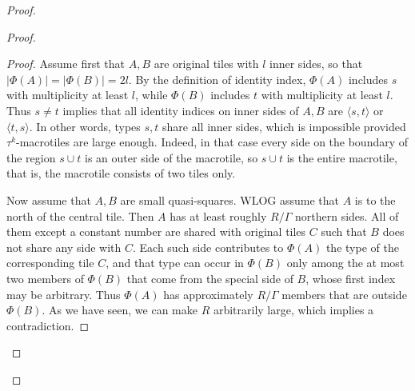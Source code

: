 \documentclass[12pt]{article}
\theoremstyle{remark}
\newcommand{\pair}[1]{\langle #1\rangle}
\begin{document}
\begin{proof}
\begin{proof}
\begin{proof}
Assume first that $A,B$ are original tiles with $l$ inner sides,
so that $|\Phi(A)|=|\Phi(B)|=2l$. By the definition of identity index,
 $\Phi(A)$ includes $s$ with multiplicity at least $l$, while $\Phi(B)$ includes $t$ with multiplicity at least $l$.
Thus $s\ne t$ implies that all identity indices on inner sides of $A,B$ are $\pair{s,t}$ or $\pair{t,s}$.
In other words, types $s,t$ share all inner sides, which is impossible provided $\tau^k$-macrotiles
are large enough. Indeed, in that case every side on the boundary of the region $s\cup t$ is an
outer side of the macrotile, so $s\cup t$ is the entire macrotile, that is, the macrotile consists
of two tiles only.

Now assume that $A,B$ are small quasi-squares. %
WLOG assume that $A$ is to the north of the central tile. Then $A$ has at least roughly $R/\Gamma$
northern sides. All of them except a constant number are shared with original tiles $C$
such that $B$ does not share any side with $C$. Each such side contributes to $\Phi(A)$ the type of
the corresponding tile $C$, and that type can occur in $\Phi(B)$ only among the at most two members
of $\Phi(B)$ that come from the special side of $B$, whose first index may be arbitrary. Thus
$\Phi(A)$ has approximately $R/\Gamma$
members that are outside $\Phi(B)$. As we have seen, we can make $R$ arbitrarily large, which implies a contradiction.
\end{proof}





\end{proof}
\end{proof}
\end{document}

